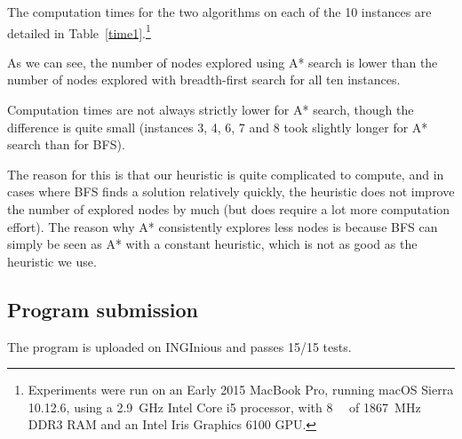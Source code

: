 \documentclass[journal]{IEEEtran}
\begin{document}
 The computation times for the two algorithms on each of the 10 instances are detailed in Table~\ref{time1}.\footnote{Experiments were run on an Early 2015 MacBook Pro, running macOS Sierra 10.12.6, using a \SI{2.9}{\giga\hertz} Intel Core i5 processor, with \SI{8}{\giga\byte} of \SI{1867}{\mega\hertz} DDR3 RAM and an Intel Iris Graphics 6100 GPU.} 

As we can see, the number of nodes explored using A* search is lower than the number of nodes explored with breadth-first search for all ten instances.

Computation times are not always strictly lower for A* search, though the difference is quite small (instances 3, 4, 6, 7 and 8 took slightly longer for A* search than for BFS).

The reason for this is that our heuristic is quite complicated to compute, and in cases where BFS finds a solution relatively quickly, the heuristic does not improve the number of explored nodes by much (but does require a lot more computation effort).
The reason why A* consistently explores less nodes is because BFS can simply be seen as A* with a constant heuristic, which is not as good as the heuristic we use.

\subsection{Program submission}
The program is uploaded on INGInious and passes 15/15 tests.
\end{document}
